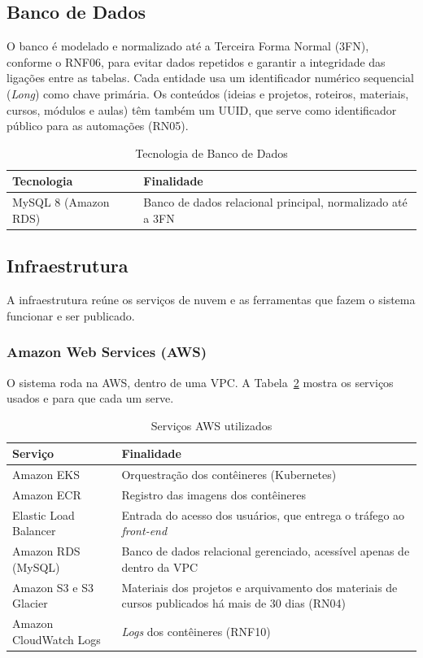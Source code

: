 \subsection{Banco de Dados}

O banco é modelado e normalizado até a Terceira Forma Normal (3FN), conforme o RNF06, para evitar dados repetidos e garantir a integridade das ligações entre as tabelas. Cada entidade usa um identificador numérico sequencial (\textit{Long}) como chave primária. Os conteúdos (ideias e projetos, roteiros, materiais, cursos, módulos e aulas) têm também um UUID, que serve como identificador público para as automações (RN05).

\begin{table}[H]
\centering
\caption{Tecnologia de Banco de Dados}
\label{tab:bd}
\begin{tabular}{|l|l|}
\hline
\textbf{Tecnologia} & \textbf{Finalidade} \\
\hline
MySQL 8 (Amazon RDS) & Banco de dados relacional principal, normalizado até a 3FN \\
\hline
\end{tabular}
\end{table}

\subsection{Infraestrutura}

A infraestrutura reúne os serviços de nuvem e as ferramentas que fazem o sistema funcionar e ser publicado.

\subsubsection{Amazon Web Services (AWS)}

O sistema roda na AWS, dentro de uma VPC. A Tabela~\ref{tab:aws} mostra os serviços usados e para que cada um serve.

\begin{table}[H]
\centering
\caption{Serviços AWS utilizados}
\label{tab:aws}
\begin{tabular}{|l|p{9cm}|}
\hline
\textbf{Serviço} & \textbf{Finalidade} \\
\hline
Amazon EKS & Orquestração dos contêineres (Kubernetes) \\
\hline
Amazon ECR & Registro das imagens dos contêineres \\
\hline
Elastic Load Balancer & Entrada do acesso dos usuários, que entrega o tráfego ao \textit{front-end} \\
\hline
Amazon RDS (MySQL) & Banco de dados relacional gerenciado, acessível apenas de dentro da VPC \\
\hline
Amazon S3 e S3 Glacier & Materiais dos projetos e arquivamento dos materiais de cursos publicados há mais de 30 dias (RN04) \\
\hline
Amazon CloudWatch Logs & \textit{Logs} dos contêineres (RNF10) \\
\hline
\end{tabular}
\end{table}

